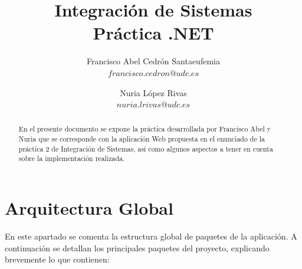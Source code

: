 \documentclass{article}
\title{\textbf{Integración de Sistemas} \\ Práctica .NET}
\author{
	Francisco Abel Cedrón Santaeufemia \\
	\texttt{$francisco.cedron@udc.es$}
	\and
	Nuria López Rivas \\
	\texttt{$nuria.lrivas@udc.es$}
	}
\date{} %
\begin{document}
\maketitle %

\renewcommand{\abstractname}{Abstract} %
\begin{abstract}
	En el presente documento se expone la práctica desarrollada por Francisco Abel y Nuria que se corresponde con la aplicación Web propuesta en el enunciado de la práctica 2 de Integración de Sistemas, así como algunos aspectos a tener en cuenta sobre la implementación realizada.
\end{abstract}

\renewcommand{\contentsname}{} %
\tableofcontents

\newpage

\section{Arquitectura Global}

	En este apartado se comenta la estructura global de paquetes de la aplicación. A continuación se detallan los principales paquetes del proyecto, explicando brevemente lo que contienen:
\end{document}

